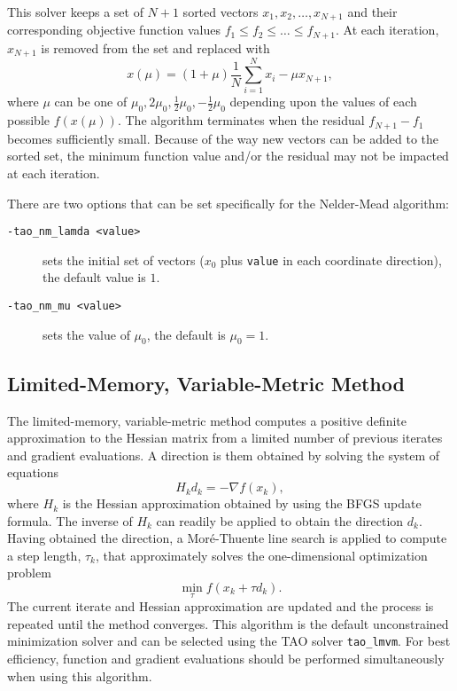 This solver keeps a set of $N+1$ sorted vectors ${x_1,x_2,\ldots,x_{N+1}}$ and their corresponding 
objective function values $f_1 \leq f_2 \leq \ldots \leq f_{N+1}$.  At each iteration, $x_{N+1}$ is removed from
the set and replaced with 
\[
x(\mu) = (1+\mu) \frac{1}{N} \sum_{i=1}^N x_i - \mu x_{N+1},
\]  
where $\mu$ can be one of ${\mu_0,2\mu_0,\frac{1}{2}\mu_0,-\frac{1}{2}\mu_0}$ depending upon the values of 
each possible $f(x(\mu))$.
The algorithm terminates when the residual  $f_{N+1} - f_1$ becomes sufficiently small.  Because of 
the way new vectors can be added to the sorted set, 
the minimum function value and/or the residual may not be impacted at each iteration.

There are two options that can be set specifically for the Nelder-Mead algorithm:
\begin{description}
\item[\tt -tao\_nm\_lamda <value>] sets the initial set of vectors ($x_0$ plus 
{\tt value} in each coordinate direction), the default value is $1$.  
\item[\tt -tao\_nm\_mu <value>] sets the value of $\mu_0$, the default 
is $\mu_0=1$.
\end{description}

\subsection{Limited-Memory, Variable-Metric Method}

The limited-memory, variable-metric method computes a positive definite
approximation to the Hessian matrix from a limited number of previous
iterates and gradient evaluations.  A direction is them obtained by
solving the system of equations
\[
H_k d_k = -\nabla f(x_k),
\]
where $H_k$ is the Hessian approximation obtained by using the BFGS update 
formula.  The inverse of $H_k$ can readily be applied to obtain the 
direction $d_k$.  Having obtained the direction, a Mor\'{e}-Thuente 
line search is applied to compute a step length, $\tau_k$, that 
approximately solves the one-dimensional optimization problem
\[
\min_\tau f(x_k + \tau d_k).
\]
The current iterate and Hessian approximation are updated and the process
is repeated until the method converges.  This algorithm is the default 
unconstrained minimization solver and can be selected using the 
TAO solver {\tt tao\_lmvm}.  For best efficiency, function and gradient 
evaluations should be performed simultaneously when using this algorithm.

